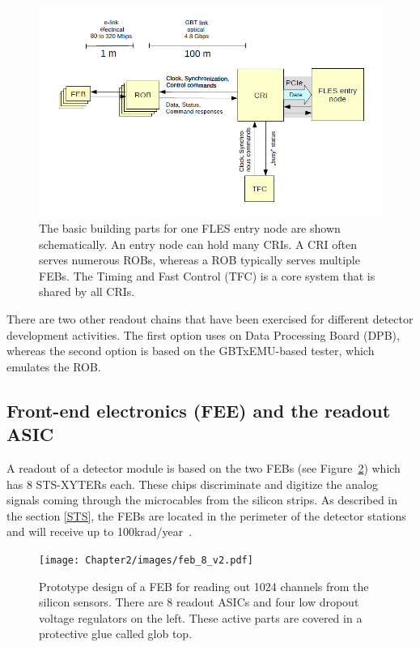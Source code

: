 \begin{figure}[!h]
\centering
\includegraphics[width=0.8\columnwidth]{Chapter2/images/CRI_DAQ.png}
\caption{The basic building parts for one \gls{FLES} entry node are shown schematically. An entry node can hold many \glspl{CRI}. A \gls{CRI} often serves numerous \glspl{ROB}, whereas a \gls{ROB} typically serves multiple \glspl{FEB}. The Timing and Fast Control (\gls{TFC}) is a core system that is shared by all \glspl{CRI}.}
\label{fig_daq_cri}
\end{figure}

There are two other readout chains that have been exercised for different detector development activities. The first option uses on Data Processing Board (\gls{DPB}), whereas
the second option is based on the GBTxEMU-based tester, which emulates the \gls{ROB}.


\subsection{Front-end electronics (FEE) and the readout ASIC}

A readout of a detector module is based on the two \glspl{FEB} (see Figure~\ref{fig_feb}) which has 8 STS-XYTERs each. These chips discriminate and digitize the analog signals coming through the microcables from the silicon strips. As described in the section \ref{STS}, the \glspl{FEB} are located in the perimeter of the detector stations and will receive up to 100krad/year~\cite{Heuser:54798}.

\begin{figure}[!h]
\centering
\texttt{[image: Chapter2/images/feb\_8\_v2.pdf]}
\caption{Prototype design of a \gls{FEB} for reading out 1024 channels from the silicon sensors. There are 8 readout ASICs and four low dropout voltage regulators on the left. These active parts are covered in a protective glue called glob top.}
\label{fig_feb}
\end{figure}

